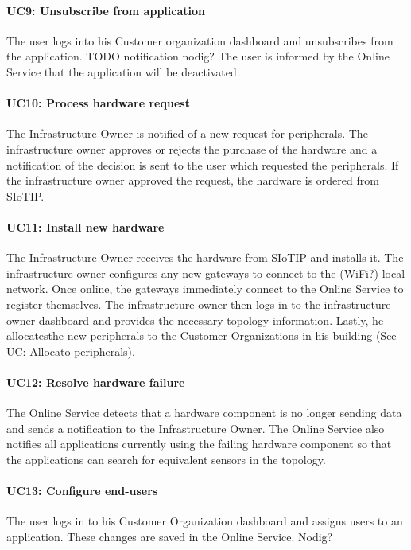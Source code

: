 \documentclass[english]{sareport}
\begin{document}
\paragraph{UC9: Unsubscribe from application}
The user logs into his Customer organization dashboard and unsubscribes from the application. TODO notification nodig? The user is informed by the Online Service that the application will be deactivated.

\paragraph{UC10: Process hardware request}
The Infrastructure Owner is notified of a new request for peripherals. The infrastructure owner approves or rejects the purchase of the hardware and a notification of the decision is sent to the user which requested the peripherals. If the infrastructure owner approved the request, the hardware is ordered from SIoTIP.

\paragraph{UC11: Install new hardware}
The Infrastructure Owner receives the hardware from SIoTIP and installs it. The infrastructure owner configures any new gateways to connect to the (WiFi?) local network. Once online, the gateways immediately connect to the Online Service to register themselves. The infrastructure owner then logs in to the infrastructure owner dashboard and provides the necessary topology information. Lastly, he allocatesthe new peripherals to the Customer Organizations in his building (See UC: Allocato peripherals).

\paragraph{UC12: Resolve hardware failure}
The Online Service detects that a hardware component is no longer sending data and sends a notification to the Infrastructure Owner. The Online Service also notifies all applications currently using the failing hardware component so that the applications can search for equivalent sensors in the topology. 

\paragraph{UC13: Configure end-users}
The user logs in to his Customer Organization dashboard and assigns users to an application. These changes are saved in the Online Service.
Nodig?
\end{document}
